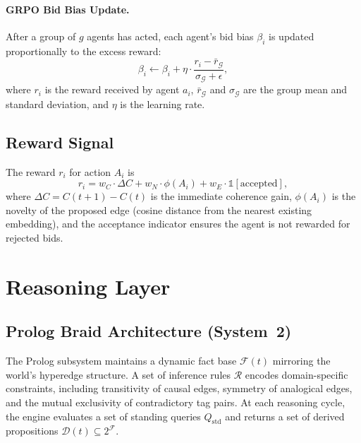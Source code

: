 \documentclass[11pt]{article}
\begin{document}
\paragraph{GRPO Bid Bias Update.}
After a group of $g$ agents has acted, each agent's bid bias $\beta_i$ is
updated proportionally to the excess reward:
\begin{equation}
  \beta_i \leftarrow \beta_i + \eta \cdot \frac{r_i - \bar{r}_{\mathcal{G}}}
                                                {\sigma_{\mathcal{G}} + \epsilon},
  \label{eq:grpo}
\end{equation}
where $r_i$ is the reward received by agent $a_i$, $\bar{r}_{\mathcal{G}}$ and
$\sigma_{\mathcal{G}}$ are the group mean and standard deviation, and $\eta$ is
the learning rate.

\subsection{Reward Signal}

The reward $r_i$ for action $A_i$ is
\begin{equation}
  r_i = w_C \cdot \Delta C + w_N \cdot \phi(A_i) + w_E \cdot \mathbb{1}[\text{accepted}],
  \label{eq:reward}
\end{equation}
where $\Delta C = C(t{+}1) - C(t)$ is the immediate coherence gain, $\phi(A_i)$
is the novelty of the proposed edge (cosine distance from the nearest existing
embedding), and the acceptance indicator ensures the agent is not rewarded for
rejected bids.

\section{Reasoning Layer}
\nopagebreak[4]
\label{sec:reasoning}

\subsection{Prolog Braid Architecture (System~2)}

The Prolog subsystem maintains a dynamic fact base $\mathcal{F}(t)$ mirroring
the world's hyperedge structure. A set of inference rules $\mathcal{R}$ encodes
domain-specific constraints, including transitivity of causal edges, symmetry of
analogical edges, and the mutual exclusivity of contradictory tag pairs. At each
reasoning cycle, the engine evaluates a set of standing queries $Q_{\text{std}}$
and returns a set of derived propositions $\mathcal{D}(t) \subseteq 2^{\mathcal{F}}$.
\end{document}
